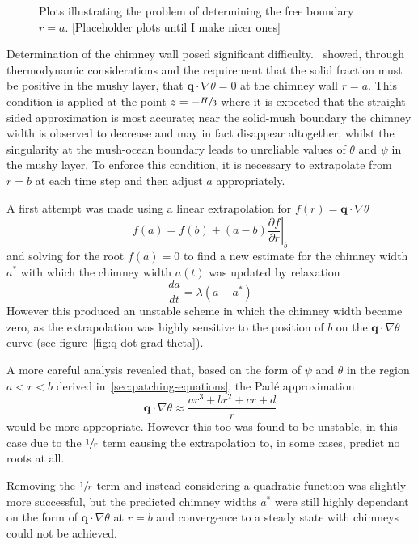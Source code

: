 \documentclass[11pt]{proc}
\begin{document}
\begin{figure}[t!]
\caption{Plots illustrating the problem of determining the free boundary $r=a$. [Placeholder plots until I make nicer ones]}
\label{fig:free-boundary-method}  

\end{figure}

Determination of the chimney wall posed significant difficulty.~\citet*{schulze-worster-99} showed, through thermodynamic considerations and the requirement that the solid fraction must be positive in the mushy layer, that  $\mathbf{q} \cdot \nabla \theta = 0$ at the chimney wall $r=a$. This condition is applied at the point $z = - \sfrac{H}{3}$ where it is expected that the straight sided approximation is most accurate; near the solid-mush boundary the chimney width is observed to decrease and may in fact disappear altogether, whilst the singularity at the mush-ocean boundary leads to unreliable values of $\theta$ and $\psi$ in the mushy layer. To enforce this condition, it is necessary to extrapolate from $r=b$ at each time step and then adjust $a$ appropriately. 

A first attempt was made using a linear extrapolation for $f(r) = \mathbf{q} \cdot \nabla \theta$
\begin{equation}
f(a) = f(b) + (a-b) \left. \frac{\partial f}{\partial r}\right|_b
\end{equation}
and solving for the root $f(a)=0$ to find a new estimate for the chimney width $a^*$ with which the chimney width $a(t)$ was updated by relaxation
\begin{equation}
\frac{da}{dt} = \lambda (a - a^*)
\end{equation}
However this produced an unstable scheme in which the chimney width became zero, as the extrapolation was highly sensitive to the position of $b$ on the $\mathbf{q} \cdot \nabla \theta$ curve (see figure~\ref{fig:q-dot-grad-theta}).

A more careful analysis revealed that, based on the form of $\psi$ and $\theta$ in the region $a < r < b$ derived in~\autoref{sec:patching-equations}, the Pad\'{e} approximation
\begin{equation}
\mathbf{q} \cdot \nabla \theta \approx \frac{a r^3 + b r^2 + c r + d}{r}
\end{equation}
would be more appropriate. However this too was found to be unstable, in this case due to the $\sfrac{1}{r}$ term causing the extrapolation to, in some cases, predict no roots at all.

Removing the $\sfrac{1}{r}$ term and instead considering a quadratic function was slightly more successful, but the predicted chimney widths $a^*$ were still highly dependant on the form of $\mathbf{q} \cdot \nabla \theta$ at $r=b$ and convergence to a steady state with chimneys could not be achieved.
\end{document}
